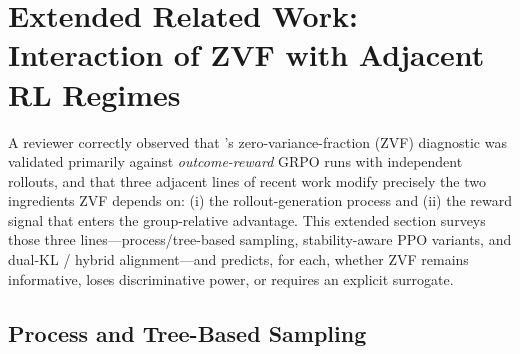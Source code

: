 
\section{Extended Related Work: Interaction of ZVF with Adjacent RL Regimes}
\label{sec:extended-related-work}

A reviewer correctly observed that \ours{}'s zero-variance-fraction (ZVF)
diagnostic was validated primarily against \emph{outcome-reward} GRPO runs with
independent rollouts, and that three adjacent lines of recent work modify
precisely the two ingredients ZVF depends on: (i) the rollout-generation
process and (ii) the reward signal that enters the group-relative advantage.
This extended section surveys those three lines---process/tree-based
sampling, stability-aware PPO variants, and dual-KL / hybrid alignment---and
predicts, for each, whether ZVF remains informative, loses discriminative
power, or requires an explicit surrogate.

\subsection{Process and Tree-Based Sampling}
\label{sec:ext:tree-prm}

